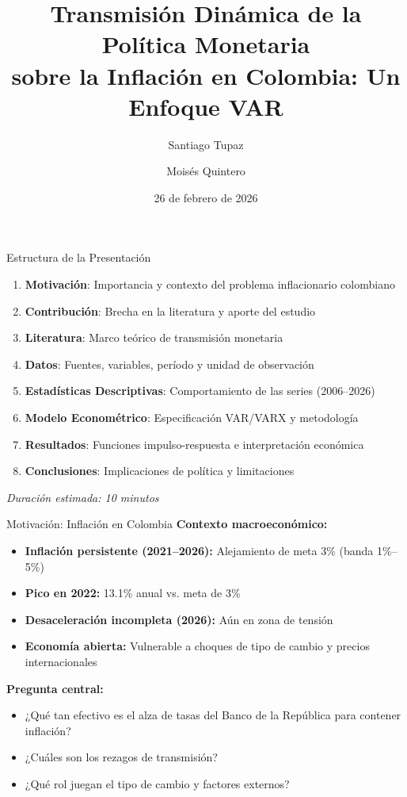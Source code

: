 \documentclass{beamer}
\title[Política Monetaria Colombia]{Transmisión Dinámica de la Política Monetaria\\
sobre la Inflación en Colombia: Un Enfoque VAR}
\author{Santiago Tupaz \and Moisés Quintero}
\institute{Universidad EAFIT -- Econometría II}
\date{26 de febrero de 2026}
\begin{document}
\frame{\titlepage}

\begin{frame}{Estructura de la Presentación}
\begin{enumerate}
\item \textbf{Motivación}: Importancia y contexto del problema inflacionario colombiano
\item \textbf{Contribución}: Brecha en la literatura y aporte del estudio
\item \textbf{Literatura}: Marco teórico de transmisión monetaria
\item \textbf{Datos}: Fuentes, variables, período y unidad de observación
\item \textbf{Estadísticas Descriptivas}: Comportamiento de las series (2006--2026)
\item \textbf{Modelo Econométrico}: Especificación VAR/VARX y metodología
\item \textbf{Resultados}: Funciones impulso-respuesta e interpretación económica
\item \textbf{Conclusiones}: Implicaciones de política y limitaciones
\end{enumerate}
\vspace{0.3cm}
\small \textit{Duración estimada: 10 minutos}
\end{frame}

\begin{frame}{Motivación: Inflación en Colombia}
\textbf{Contexto macroeconómico:}
\begin{itemize}
\item \textbf{Inflación persistente (2021--2026):} Alejamiento de meta 3\% (banda 1\%--5\%)
\item \textbf{Pico en 2022:} 13.1\% anual vs. meta de 3\%
\item \textbf{Desaceleración incompleta (2026):} Aún en zona de tensión
\item \textbf{Economía abierta:} Vulnerable a choques de tipo de cambio y precios internacionales
\end{itemize}

\vspace{0.3cm}
\textbf{Pregunta central:}
\begin{itemize}
\item ¿Qué tan efectivo es el alza de tasas del Banco de la República para contener inflación?
\item ¿Cuáles son los rezagos de transmisión?
\item ¿Qué rol juegan el tipo de cambio y factores externos?
\end{itemize}
\end{frame}
\end{document}
